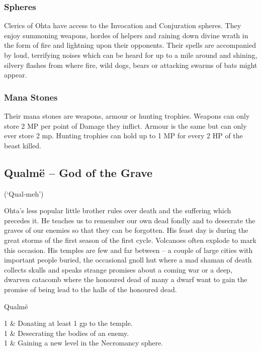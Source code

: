 \begin{multicols}{2}
\subsubsection{Spheres}

Clerics of Ohta have access to the Invocation and Conjuration spheres.
They enjoy summoning weapons, hordes of helpers and raining down divine wrath in the form of fire and lightning upon their opponents.
Their spells are accompanied by loud, terrifying noises which can be heard for up to a mile around and shining, silvery flashes from where fire, wild dogs, bears or attacking swarms of bats might appear.

\subsubsection{Mana Stones}

Their mana stones are weapons, armour or hunting trophies.
Weapons can only store 2 MP per point of Damage they inflict.
Armour is the same but can only ever store 2 \gls{mp}.
Hunting trophies can hold up to 1 MP for every 2 HP of the beast killed.

\subsection{Qualm\"{e} -- God of the Grave}
(`Qual-meh')

\noindent Ohta's less popular little brother rules over death and the suffering which precedes it. He teaches us to remember our own dead fondly and to desecrate the graves of our enemies so that they can be forgotten. His feast day is during the great storms of the first season of the first cycle. Volcanoes often explode to mark this occasion. His temples are few and far between -- a couple of large cities with important people buried, the occasional gnoll hut where a mad shaman of death collects skulls and speaks strange promises about a coming war or a deep, dwarven catacomb where the honoured dead of many a dwarf want to gain the promise of being lead to the halls of the honoured dead.

\begin{xpchart}{Qualm\"{e}}

	1 & Donating at least 1 gp to the temple. \\

	1 & Desecrating the bodies of an enemy. \\

	1 & Gaining a new level in the Necromancy sphere. \\


\end{xpchart}
\end{multicols}
